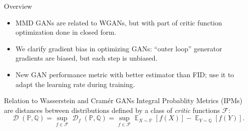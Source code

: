 \documentclass[xcolor={table}]{beamer}
\DeclareMathOperator{\D}{\mathcal{D}}
\DeclareMathOperator*{\E}{\mathbb{E}}
\newcommand{\F}{\mathcal{F}}
\newcommand{\PP}{\mathbb P}
\newcommand{\QQ}{\mathbb Q}
\begin{document}
\begin{frame}{}
\maketitle
\begin{columns}[T, totalwidth=\textwidth]

  \begin{column}{.32\textwidth}
    \begin{block}{Overview}
      \begin{itemize}
        \item MMD GANs are related to WGANs, but with part of critic function optimization done in closed form.
        \item We clarify gradient bias in optimizing GANs:
              ``outer loop'' generator gradients are biased,
              but each step is unbiased.
        \item New GAN performance metric with better estimator than FID;
              use it to adapt the learning rate during training.
      \end{itemize}
    \end{block}
    \begin{block}{Relation to Wasserstein and Cram\'er GANs} 
      Integral Probablity Metrics (IPMs) %
      are distances between distributions
      defined by a class of \emph{critic} functions $\F$:
      \[
        \D(\PP, \QQ)
        = \sup_{f \in \F} \D_f(\PP, \QQ)
        = \sup_{f\in\F} \E_{X\sim\PP}[f(X)] - \E_{Y\sim\QQ}[f(Y)].
      \]


\end{block}
\end{column}
\end{columns}
\end{frame}
\end{document}
